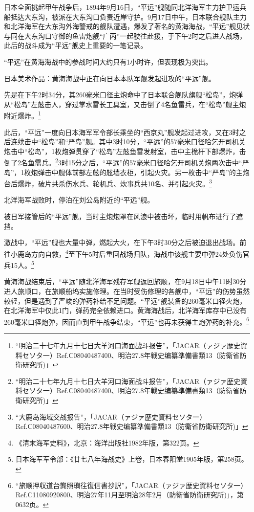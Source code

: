 \documentclass[12pt,UTF8]{ctexbook}
\begin{document}
日本全面挑起甲午战争后，1894年9月16日，“平远”舰随同北洋海军主力护卫运兵船抵达大东沟，被派在大东沟口负责近岸守护。9月17日中午，日本联合舰队主力和北洋海军在大东沟外海警戒的舰队遭遇，爆发了著名的黄海海战，“平远”舰见状与同在大东沟口守御的鱼雷炮舰“广丙”一起驶往赴援，于下午2时之后进人战场，此后的战斗成为“平远”舰史上重要的一笔记录。

“平远”在黄海海战中的参战时间大约只有1小时许，但表现极为突出。

日本美术作品：黄海海战中正在向日本本队军舰发起进攻的“平远”舰。

先是在下午2时34分，其260毫米口径主炮命中了日本联合舰队旗舰“松岛”，炮弹从“松岛”左舷击人，穿过掌水雷长工具室，又击倒了4名鱼雷兵，在“松岛”舰主炮附近爆炸。\footnote{“明治二十七年九月十七日大羊河口海面战斗报告”，「JACAR（ァジァ歴史資料セソタ一）Ref.C08040487400、明治27.8年戦史编纂準備書類13（防衛省防衛研究所)」}

此后，“平远”一度向日本海军军令部长乘坐的“西京丸”舰发起过进攻，又在3时之后连续击中“松岛”和“严岛”舰。其中3时10分，“平远”的57毫米口径哈乞开司机关炮击中“松岛”，1枚炮弹贯穿了“松岛”左舷鱼雷发射室，击中主桅杆下部爆炸，击倒了2名鱼需兵。\footnote{“明治二十七年九月十七日大羊河口海面战斗报告”，「JACAR（ァジァ歴史資料セソタ一）Ref.C08040487400、明治27.8年戦史编纂準備書類13（防衛省防衛研究所)」}3时15分之后，“平远”的57毫米口径哈乞开司机关炮两次击中“严岛”，1枚炮弹击中舰体前部左舷的舷墙衣柜，引起火灾。另一枚击中“严岛”的主炮台后爆炸，破片共杀伤水兵、轮机兵、炊事兵共10名、并引起火灾。\footnote{“大鹿岛海域交战报告”，「JACAR（ァジァ歴史資料セソタ一）Ref.C08040487600、明治27.8年戦史编纂準備書類13（防衛省防衛研究所)」}

北洋海军战败时，停泊在刘公岛附近的“平远”舰。

被日军接管后的“平远”舰，当时主炮炮罩在风浪中被击坏，临时用帆布进行了遮挡。

激战中，“平远”舰也大量中弹，燃起大火，在下午3时30分之后被迫退出战场。前往小鹿岛方向自救，\footnote{《清末海军史料》，北京：海洋出版社1982年版，第322页。}至下午5时后重回战场归队，海战中该舰主要中弹24处负伤官兵15人。\footnote{日本海军军令部：《廿七八年海战史》上卷，日本春阳堂1905年版，第258页。}

黄海海战结束后，“平远”随北洋海军残存军舰返回旅顺，在9月18日中午11时30分进人旅顺口，在旅顺船坞实施修理。在当时受伤修理的各舰中，“平远”的伤势虽然较轻，但是遇到了严峻的弹药补给不足问题。“平远”舰装备的260毫米口径火炮，在北洋海军中仅此1门，弹药完全依赖进口。黄海海战后，北洋海军库存中已没有260毫米口径炮弹，因而直到甲午战争结束，“平远”也再未获得主炮弹药的补充。\footnote{“旅顺押収道台龔照璵往復信書抄訳”，「JACAR（ァジァ歴史資料セソタ一）Ref.C11080920800、明治27年11月至明治28年2月（防衛省防衛研究所)」，第0632页。}
\end{document}
